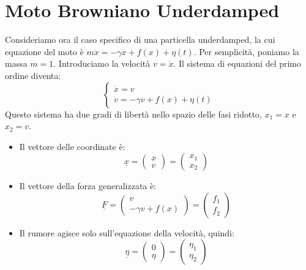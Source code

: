 \section{Moto Browniano Underdamped}
Consideriamo ora il caso specifico di una particella underdamped, la cui equazione del moto è $m\ddot{x} = -\gamma \dot{x} + f(x) + \eta(t)$. Per semplicità, poniamo la massa $m=1$. Introduciamo la velocità $v = \dot{x}$. Il sistema di equazioni del primo ordine diventa:
\begin{equation}
\begin{cases}
\dot{x} = v \\
\dot{v} = -\gamma v + f(x) + \eta(t)
\end{cases}
\label{eq:underdamped_sys}
\end{equation}
Questo sistema ha due gradi di libertà nello spazio delle fasi ridotto, $x_1 = x$ e $x_2 = v$.

\begin{itemize}
    \item Il vettore delle coordinate è:
    \begin{equation}  \underline{x} = \begin{pmatrix} x \\ v \end{pmatrix} = \begin{pmatrix} x_1 \\ x_2 \end{pmatrix} \end{equation}
    \item Il vettore della forza generalizzata è:
    \begin{equation}  \underline{F} = \begin{pmatrix} v \\ -\gamma v + f(x)\end{pmatrix} = \begin{pmatrix} f_1 \\ f_2\end{pmatrix} \end{equation}
    \item Il rumore agisce solo sull'equazione della velocità, quindi:
    \begin{equation}  \underline{\eta} = \begin{pmatrix} 0 \\ \eta \end{pmatrix} = \begin{pmatrix} \eta _1 \\ \eta _2\end{pmatrix} \end{equation}
\end{itemize}

